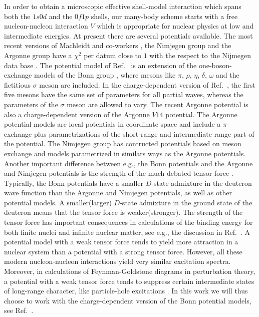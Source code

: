 In order to obtain a microscopic 
 effective shell-model interaction
which spans both the $1s0d$ and the $0f1p$ shells, our many-body
scheme 
starts with a free nucleon-nucleon  interaction $V$ which is
appropriate for nuclear physics at low and intermediate energies. 
At present there are several potentials
available. The most recent versions of Machleidt and co-workers
\cite{cdbonn}, the Nimjegen group \cite{nim} and the Argonne
group \cite{v18} have a $\chi^2$ per datum close to $1$
with the respect to the Nijmegen data base \cite{nimbase}. 
The potential
model of Ref.\ \cite{cdbonn} is an extension 
of the one-boson-exchange
models of the Bonn group \cite{mac89}, where mesons like 
$\pi$, $\rho$, $\eta$, $\delta$, $\omega$ and the fictitious
$\sigma$ meson are included. In the charge-dependent version
of Ref.\ \cite{cdbonn}, the first five mesons have the same set
of parameters for all partial waves, whereas the parameters of
the $\sigma$ meson are allowed to vary. The recent Argonne potential
\cite{v18} is also a charge-dependent version of the Argonne
$V14$ \cite{v14} potential. The Argonne potential models
are local potentials in coordinate space and include
a $\pi$-exchange plus parametrizations of the short-range
and intermediate range part of the potential. The Nimjegen group   
\cite{nim} 
has contructed potentials based on meson exchange and models parametrized
in similars ways as the Argonne potentials.
Another important difference between e.g., the Bonn potentials
and the Argonne and Nimjegen potentials is the strength of the much debated
tensor force \cite{bm95}. Typically, the Bonn potentials have 
a smaller $D$-state admixture in the deuteron wave function
than the Argonne and Nimjegen potentials, as well as
other potential models. A smaller(larger) $D$-state
admixture in the ground state of the deuteron 
means that the tensor force is weaker(stronger).
The strength of the tensor force has important consequences 
in calculations of the binding energy for both
finite nuclei and infinite nuclear matter, 
see e.g., the discussion
in Ref.\ \cite{hko95}. 
A potential model  with a weak tensor force
tends to yield more attraction in a nuclear system than a 
potential with a strong tensor force. However,
all these modern nucleon-nucleon interactions yield
very similar excitation spectra. Moreover, in calculations
of Feynman-Goldstone diagrams in perturbation theory, a potential with a
weak tensor force tends to suppress certain intermediate
states of long-range character, like particle-hole excitations
\cite{sommer81}.
In this work we will thus choose to work with the charge-dependent
version of the Bonn potential models, see Ref.\ \cite{cdbonn}.

